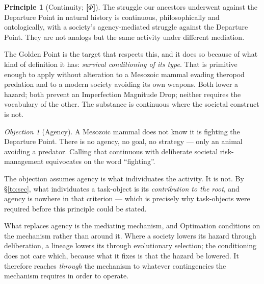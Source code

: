 \documentclass[11pt]{article}
\numberwithin{equation}{section}
\theoremstyle{plain}
\theoremstyle{definition}
\newtheorem{principle}{Principle}
\theoremstyle{remark}
\newtheorem{objection}[theorem]{Objection}
\begin{document}
\begin{principle}[Continuity; \textbf{[$\Phi$]}]\label{gc:prin:continuity}
The struggle our ancestors underwent against the Departure Point in
natural history is continuous, philosophically and ontologically, with a
society's agency-mediated struggle against the Departure Point. They are
not analogs but the same activity under different mediation.
\end{principle}

The Golden Point is the target that respects this, and it does so
because of what kind of definition it has: \emph{survival conditioning
of its type}. That is primitive enough to apply without alteration to a
Mesozoic mammal evading theropod predation and to a modern society
avoiding its own weapons. Both lower a hazard; both prevent an
Imperfection Magnitude Drop; neither requires the vocabulary of the
other. The substance is continuous where the societal construct is not.

\begin{objection}[Agency]\label{gc:obj:agency}
A Mesozoic mammal does not know it is fighting the Departure Point.
There is no agency, no goal, no strategy --- only an animal avoiding a
predator. Calling that continuous with deliberate societal
risk-management equivocates on the word ``fighting''.
\end{objection}

\noindent The objection assumes agency is what individuates the
activity. It is not. By \S\ref{to:sec}, what individuates a task-object
is its \emph{contribution to the root}, and agency is nowhere in that
criterion --- which is precisely why task-objects were required before
this principle could be stated.

What replaces agency is the mediating mechanism, and Optimation
conditions on the mechanism rather than around it. Where a society
lowers its hazard through deliberation, a lineage lowers its through
evolutionary selection; the conditioning does not care which, because
what it fixes is that the hazard be lowered. It therefore reaches
\emph{through} the mechanism to whatever contingencies the mechanism
requires in order to operate.
\end{document}
